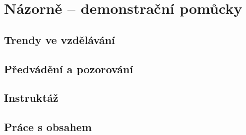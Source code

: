 \chapter{Názorně -- demonstrační pomůcky}


\section{Trendy ve vzdělávání}

\section{Předvádění a pozorování}

\section{Instruktáž}

\section{Práce s obsahem}

\newpage